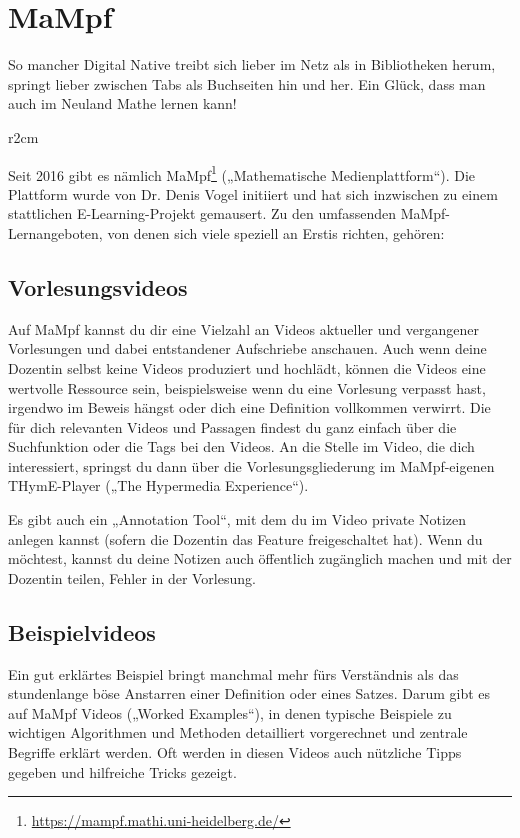 
\section{MaMpf}
\label{mampf}

\noindent So mancher Digital Native treibt sich lieber im Netz als in Bibliotheken herum, springt lieber zwischen Tabs als Buchseiten hin und her. Ein Glück, dass man auch im Neuland Mathe lernen kann!

\begin{wrapfigure}[7]{r}{2cm}
\vspace{-3mm} %
\hspace*{-7mm}
\end{wrapfigure}

Seit 2016 gibt es nämlich MaMpf\footnote{\url{https://mampf.mathi.uni-heidelberg.de/}} („Mathematische Medienplattform“). Die Plattform wurde von Dr. Denis Vogel initiiert und hat sich inzwischen zu einem stattlichen E-Learning-Projekt gemausert. Zu den umfassenden MaMpf-Lernangeboten, von denen sich viele speziell an Erstis richten, gehören: 
 
\subsection{Vorlesungsvideos}
Auf MaMpf kannst du dir eine Vielzahl an Videos aktueller und vergangener Vorlesungen und dabei entstandener Aufschriebe anschauen. Auch wenn deine Dozentin selbst keine Videos produziert und hochlädt, können die Videos eine wertvolle Ressource sein, beispielsweise wenn du eine Vorlesung verpasst hast, irgendwo im Beweis hängst oder dich eine Definition vollkommen verwirrt. Die für dich relevanten Videos und Passagen findest du ganz einfach über die Suchfunktion oder die Tags bei den Videos. An die Stelle im Video, die dich interessiert, springst du dann über die Vorlesungsgliederung im MaMpf-eigenen THymE-Player („The Hypermedia Experience“).

Es gibt auch ein „Annotation Tool“, mit dem du im Video private Notizen anlegen kannst (sofern die Dozentin das Feature freigeschaltet hat). Wenn du möchtest, kannst du deine Notizen auch öffentlich zugänglich machen und mit der Dozentin teilen, \zB Fehler in der Vorlesung.

\subsection{Beispielvideos}
Ein gut erklärtes Beispiel bringt manchmal mehr fürs Verständnis als das stundenlange böse Anstarren einer Definition oder eines Satzes. Darum gibt es auf MaMpf Videos („Worked Examples“), in denen typische Beispiele zu wichtigen Algorithmen und Methoden detailliert vorgerechnet und zentrale Begriffe erklärt werden. Oft werden in diesen Videos auch nützliche Tipps gegeben und hilfreiche Tricks gezeigt.

